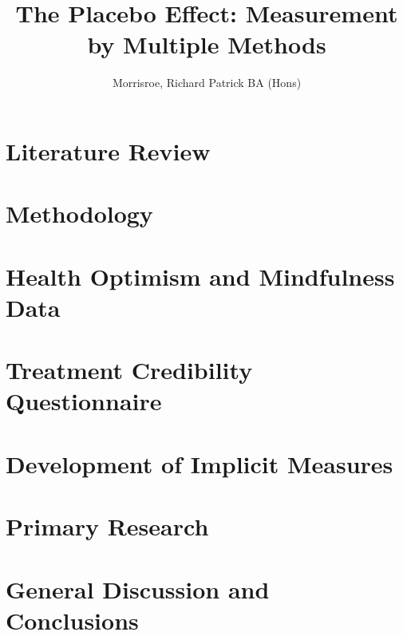\documentclass[apsych, phd]{uccthesis}
\title{The Placebo Effect: Measurement by Multiple Methods}
\author{Morrisroe, Richard Patrick BA (Hons)}
\begin{document}


\tableofcontents

\label{cha:intr-rese}


\chapter{Literature Review}
\label{cha:literature-review}


\chapter{Methodology}
\label{cha:methodology}



% 



\chapter{Health Optimism and Mindfulness Data}
\label{cha:health-for-thesis}


\chapter{Treatment Credibility Questionnaire}
\label{cha:tcq-thesis}


\chapter{Development of Implicit Measures}
\label{cha:devel-impl-meas}


\chapter{Primary Research}
\label{cha:primary-research}


\chapter{General Discussion and Conclusions}
\label{cha:general-discussion}




\end{document}
